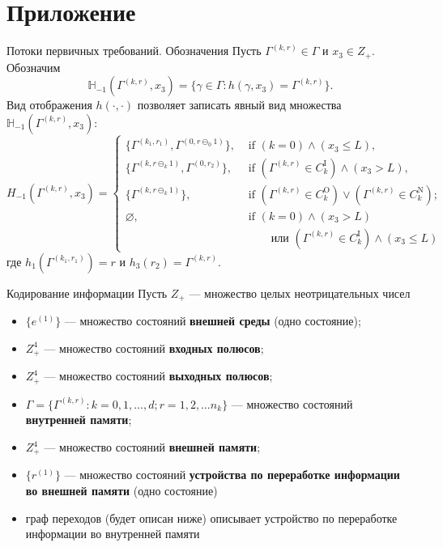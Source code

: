 \documentclass[10pt]{beamer}
\newcommand{\backupbegin}{
   \newcounter{framenumberappendix}
   \setcounter{framenumberappendix}{\value{framenumber}}
}
\begin{document}
\appendix
\section{Приложение}
\backupbegin

\begin{frame}[allowframebreaks]{Потоки первичных требований. Обозначения}
Пусть $\Gamma^{(k,r)}\in \Gamma$ и $x_3 \in Z_+$. Обозначим 
$$
{\mathbb H}_{-1}(\Gamma^{(k,r)}, x_3) = \{\gamma \in \Gamma \colon h(\gamma, x_3) = \Gamma^{(k,r)}\}.
$$
Вид отображения $h(\cdot,\cdot)$ позволяет записать явный вид множества ${\mathbb H}_{-1}(\Gamma^{(k,r)}, x_3)$:
\begin{equation*}
H_{-1}(\Gamma^{(k,r)}, x_3) = 
\begin{cases}
\bigl\{\Gamma^{(k_1,r_1)}, \Gamma^{(0,r\ominus_0 1)}\bigr\},&  \text{ if  $(k=0) \wedge (x_3 \leqslant L)$,}\\
\bigl\{\Gamma^{(k,r\ominus_k 1)}, \Gamma^{(0,r_2)}\bigr\},&  \text{ if  $(\Gamma^{(k,r)}\in C_k^{\mathrm{I}})
  \wedge (x_3>L)$,}\\ 
\bigl\{\Gamma^{(k,r\ominus_k 1)}\bigr\},&  \text{ if  $(\Gamma^{(k,r)}\in C_k^{\mathrm{O}}) \vee (\Gamma^{(k,r)}\in C_k^{\mathrm{N}})$;}\\
\varnothing,&  \text{ if  $(k = 0)\wedge  (x_3>L)$}\\
 & \qquad \text{ или $(\Gamma^{(k,r)}\in C_k^{\mathrm{I}}) \wedge (x_3\leqslant L)$}
\end{cases}
\end{equation*}
где $h_1(\Gamma^{(k_1,r_1)})=r$ и $h_3(r_2)=\Gamma^{(k,r)}$.
\framebreak

\end{frame}

\begin{frame}{Кодирование информации}
Пусть $Z_+$ --- множество целых неотрицательных чисел
  \begin{itemize}
  \item $\{e^{(1)}\}$ --- множество состояний \textbf{внешней среды} (одно состояние);
  \item $Z^4_+$ --- множество состояний \textbf{входных полюсов};
  \item $Z^4_+$ --- множество состояний \textbf{выходных полюсов};
 \item $\Gamma=\{\Gamma^{(k,r)} \colon k=0,1,\ldots,d; r=1,2,\ldots n_k\}$ --- множество состояний \textbf{внутренней памяти};
   \item $Z^4_+$ --- множество состояний \textbf{внешней памяти};
   \item $\{r^{(1)}\}$ --- множество состояний \textbf{устройства по переработке информации во внешней памяти} (одно состояние)
   \item граф переходов (будет описан ниже) описывает устройство по переработке информации во внутренней памяти
   \end{itemize}
\end{frame}
\end{document}

